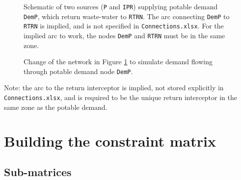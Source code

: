 \documentclass[11pt]{article}
\newcommand{\connections}{\texttt{Connections.xlsx}}
\begin{document}
\begin{figure}[ht]
	\centering
	\caption{
		Schematic of two sources (\texttt{P} and \texttt{IPR}) supplying potable demand \texttt{DemP}, which return waste-water to \texttt{RTRN}.
		The arc connecting \texttt{DemP} to \texttt{RTRN} is implied, and is not specified in \connections.
		For the implied arc to work, the nodes \texttt{DemP} and \texttt{RTRN} must be in the same zone.
	}
	\label{fig:demand1}
\end{figure}

\begin{figure}[ht]
	\centering
	\caption{
		Change of the network in Figure \ref{fig:demand1} to simulate demand flowing through potable demand node \texttt{DemP}.
	}
	\label{fig:demand2}
\end{figure}

Note: the arc to the return interceptor is implied, not stored explicitly in \connections, and is required to be the unique return interceptor in the same zone as the potable demand.


\section{Building the constraint matrix}
\label{sec:A}

\subsection{Sub-matrices}
\label{ssec:submatrices}
\end{document}
